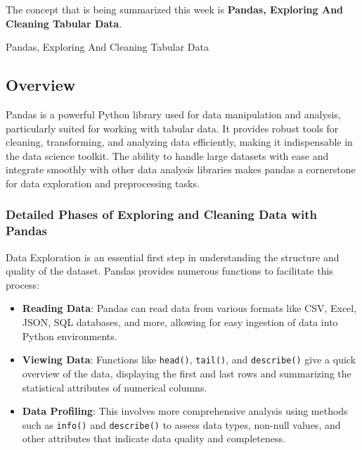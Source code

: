 The concept that is being summarized this week is \textbf{Pandas, Exploring And Cleaning Tabular Data}.

\begin{notes}{Pandas, Exploring And Cleaning Tabular Data}
    \subsection*{Overview}

    Pandas is a powerful Python library used for data manipulation and analysis, particularly suited for working with tabular data. It provides robust tools for cleaning, transforming, and analyzing 
    data efficiently, making it indispensable in the data science toolkit. The ability to handle large datasets with ease and integrate smoothly with other data analysis libraries makes pandas a 
    cornerstone for data exploration and preprocessing tasks. \vspace*{1em}
    
    \subsubsection*{Detailed Phases of Exploring and Cleaning Data with Pandas}
    
    Data Exploration is an essential first step in understanding the structure and quality of the dataset. Pandas provides numerous functions to facilitate this process:
    \begin{itemize}
        \item \textbf{Reading Data}: Pandas can read data from various formats like CSV, Excel, JSON, SQL databases, and more, allowing for easy ingestion of data into Python environments.
        \item \textbf{Viewing Data}: Functions like \texttt{head()}, \texttt{tail()}, and \texttt{describe()} give a quick overview of the data, displaying the first and last rows and summarizing the 
        statistical attributes of numerical columns.
        \item \textbf{Data Profiling}: This involves more comprehensive analysis using methods such as \texttt{info()} and \texttt{describe()} to assess data types, non-null values, and other attributes 
        that indicate data quality and completeness.
    \end{itemize}
    

\end{notes}
